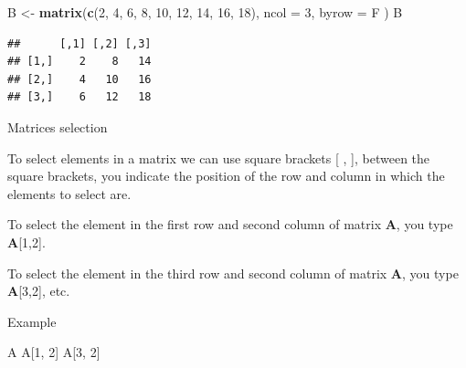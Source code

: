 \documentclass[
  ignorenonframetext,
]{beamer}
\newenvironment{Shaded}{\begin{snugshade}}{\end{snugshade}}
\newcommand{\DataTypeTok}[1]{\textcolor[rgb]{0.13,0.29,0.53}{#1}}
\newcommand{\DecValTok}[1]{\textcolor[rgb]{0.00,0.00,0.81}{#1}}
\newcommand{\KeywordTok}[1]{\textcolor[rgb]{0.13,0.29,0.53}{\textbf{#1}}}
\newcommand{\NormalTok}[1]{#1}
\newcommand{\StringTok}[1]{\textcolor[rgb]{0.31,0.60,0.02}{#1}}
\begin{document}
\begin{frame}[fragile]{}
\protect\hypertarget{section}{}

\begin{Shaded}
\begin{Highlighting}[]
\NormalTok{B <-}\StringTok{ }\KeywordTok{matrix}\NormalTok{(}\KeywordTok{c}\NormalTok{(}\DecValTok{2}\NormalTok{, }\DecValTok{4}\NormalTok{, }\DecValTok{6}\NormalTok{, }\DecValTok{8}\NormalTok{, }\DecValTok{10}\NormalTok{, }\DecValTok{12}\NormalTok{, }\DecValTok{14}\NormalTok{, }\DecValTok{16}\NormalTok{, }\DecValTok{18}\NormalTok{),}
  \DataTypeTok{ncol =} \DecValTok{3}\NormalTok{,}
  \DataTypeTok{byrow =}\NormalTok{ F}
\NormalTok{)}
\NormalTok{B}
\end{Highlighting}
\end{Shaded}

\begin{verbatim}
##      [,1] [,2] [,3]
## [1,]    2    8   14
## [2,]    4   10   16
## [3,]    6   12   18
\end{verbatim}

\end{frame}

\begin{frame}[fragile]{Matrices selection}
\protect\hypertarget{matrices-selection}{}

To select elements in a matrix we can use square brackets {[} , {]},
between the square brackets, you indicate the position of the row and
column in which the elements to select are.

To select the element in the first row and second column of matrix
\textbf{A}, you type \textbf{A}{[}1,2{]}.

To select the element in the third row and second column of matrix
\textbf{A}, you type \textbf{A}{[}3,2{]}, etc.

\begin{block}{Example}

\begin{Shaded}
\begin{Highlighting}[]
\NormalTok{A}
\NormalTok{A[}\DecValTok{1}\NormalTok{, }\DecValTok{2}\NormalTok{]}
\NormalTok{A[}\DecValTok{3}\NormalTok{, }\DecValTok{2}\NormalTok{]}
\end{Highlighting}
\end{Shaded}

\end{block}

\end{frame}
\end{document}
